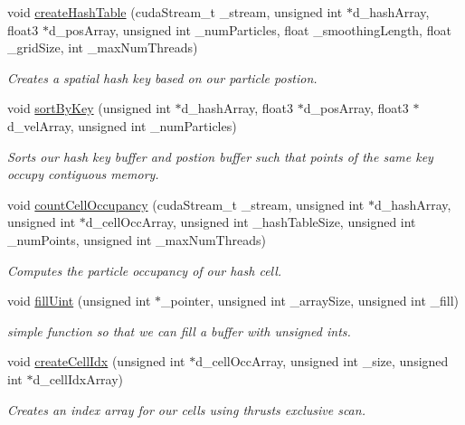 \begin{DoxyCompactItemize}
\item 
void \hyperlink{_cuda_s_p_h_kernals_8cu_afdcf7b761d59cb7dc7242693f8098380}{create\-Hash\-Table} (cuda\-Stream\-\_\-t \-\_\-stream, unsigned int $\ast$d\-\_\-hash\-Array, float3 $\ast$d\-\_\-pos\-Array, unsigned int \-\_\-num\-Particles, float \-\_\-smoothing\-Length, float \-\_\-grid\-Size, int \-\_\-max\-Num\-Threads)
\begin{DoxyCompactList}\small\item\em Creates a spatial hash key based on our particle postion. \end{DoxyCompactList}\item 
void \hyperlink{_cuda_s_p_h_kernals_8cu_a1541f8b1ee73799a0cecc7030773a6a9}{sort\-By\-Key} (unsigned int $\ast$d\-\_\-hash\-Array, float3 $\ast$d\-\_\-pos\-Array, float3 $\ast$d\-\_\-vel\-Array, unsigned int \-\_\-num\-Particles)
\begin{DoxyCompactList}\small\item\em Sorts our hash key buffer and postion buffer such that points of the same key occupy contiguous memory. \end{DoxyCompactList}\item 
void \hyperlink{_cuda_s_p_h_kernals_8cu_a5f674fd3497767724a4425bbb91a2248}{count\-Cell\-Occupancy} (cuda\-Stream\-\_\-t \-\_\-stream, unsigned int $\ast$d\-\_\-hash\-Array, unsigned int $\ast$d\-\_\-cell\-Occ\-Array, unsigned int \-\_\-hash\-Table\-Size, unsigned int \-\_\-num\-Points, unsigned int \-\_\-max\-Num\-Threads)
\begin{DoxyCompactList}\small\item\em Computes the particle occupancy of our hash cell. \end{DoxyCompactList}\item 
void \hyperlink{_cuda_s_p_h_kernals_8cu_a32490018a3312806721e0576ff6f8c7b}{fill\-Uint} (unsigned int $\ast$\-\_\-pointer, unsigned int \-\_\-array\-Size, unsigned int \-\_\-fill)
\begin{DoxyCompactList}\small\item\em simple function so that we can fill a buffer with unsigned ints. \end{DoxyCompactList}\item 
void \hyperlink{_cuda_s_p_h_kernals_8cu_a5ef63636297ac3ddbc0866064a75e12d}{create\-Cell\-Idx} (unsigned int $\ast$d\-\_\-cell\-Occ\-Array, unsigned int \-\_\-size, unsigned int $\ast$d\-\_\-cell\-Idx\-Array)
\begin{DoxyCompactList}\small\item\em Creates an index array for our cells using thrusts exclusive scan. \end{DoxyCompactList}\item 

\end{DoxyCompactItemize}
